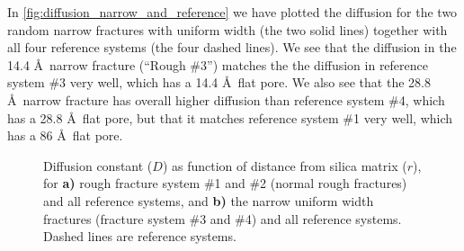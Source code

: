 In \cref{fig:diffusion_narrow_and_reference} we have plotted the diffusion for the two random narrow fractures with uniform width (the two solid lines) together with all four reference systems (the four dashed lines). We see that the diffusion in the 14.4 \AA\ narrow fracture (``Rough \#3'') matches the the diffusion in reference system \#3 very well, which has a 14.4 \AA\ flat pore. We also see that the 28.8 \AA\ narrow fracture has overall higher diffusion than reference system \#4, which has a 28.8 \AA\ flat pore, but that it matches reference system \#1 very well, which has a 86 \AA\ flat pore.
%
\begin{figure}[!htb]%
\setlength{\myfigwidth}{0.58\textwidth}%
\makebox[\textwidth][c]{ %
    \begin{minipage}[t]{\myfigwidth}%
        \centering%
        \subcaption{\label{fig:diffusion_normal_and_reference}}%
    \end{minipage}%
    \hfill%
    \begin{minipage}[t]{\myfigwidth}%
        \centering%
        \subcaption{\label{fig:diffusion_narrow_and_reference}}%
    \end{minipage}%
}%
\caption{%
    Diffusion constant ($D$) as function of distance from silica matrix ($r$), for \textbf{a)} rough fracture system \#1 and \#2 (normal rough fractures) and all reference systems, and \textbf{b)} the narrow uniform width fractures (fracture system \#3 and \#4) and all reference systems. Dashed lines are reference systems. %
    \label{fig:last_diffusion_figure}%
}%
\end{figure}%